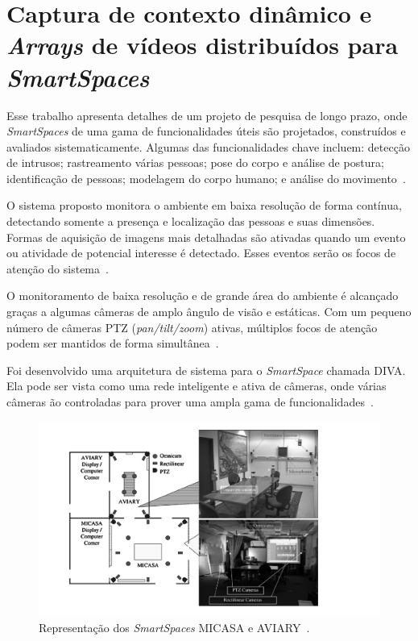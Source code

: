 \section{Captura de contexto dinâmico e \textit{Arrays} de vídeos distribuídos para \textit{SmartSpaces}}

Esse trabalho apresenta detalhes de um projeto de pesquisa de longo prazo, onde \textit{SmartSpaces} de uma gama de funcionalidades úteis são projetados, construídos e avaliados sistematicamente. Algumas das funcionalidades chave incluem: detecção de intrusos; rastreamento várias pessoas; pose do corpo e análise de postura; identificação de pessoas; modelagem do corpo humano; e análise do movimento~\cite{trivedi}.

O sistema proposto monitora o ambiente em baixa resolução de forma contínua, detectando somente a presença e localização das pessoas e suas dimensões. Formas de aquisição de imagens mais detalhadas são ativadas quando um evento ou atividade de potencial interesse é detectado. Esses eventos serão os focos de atenção do sistema~\cite{trivedi}.

O monitoramento de baixa resolução e de grande área do ambiente é alcançado graças a algumas câmeras de amplo ângulo de visão e estáticas. Com um pequeno número de câmeras PTZ (\textit{pan/tilt/zoom}) ativas, múltiplos focos de atenção podem ser mantidos de forma simultânea~\cite{trivedi}.

Foi desenvolvido uma arquitetura de sistema para o \textit{SmartSpace} chamada DIVA. Ela pode ser vista como uma rede inteligente e ativa de câmeras, onde várias câmeras ão controladas para prover uma ampla gama de funcionalidades~\cite{trivedi}.

	\begin{figure}[hbt]
		\begin{center}
			\includegraphics[scale=0.5]{figuras/3.TrabalhosCorrelatos/micasa_aviary.png}
		\end{center}
		\caption{Representação dos \textit{SmartSpaces} MICASA e AVIARY~\cite{trivedi}.}
		\label{micasa_aviary}
	\end{figure}

